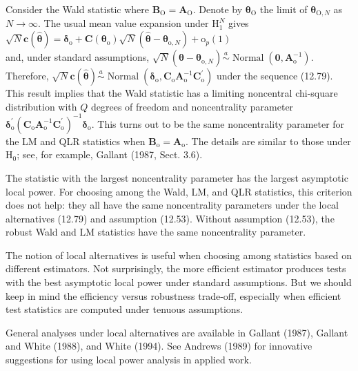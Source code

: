 \documentclass[10pt]{article}
\begin{document}
Consider the Wald statistic where $\mathbf{B}_{\mathrm{O}}=\mathbf{A}_{\mathrm{O}}$. Denote by $\boldsymbol{\theta}_{\mathrm{O}}$ the limit of $\boldsymbol{\theta}_{\mathrm{O}, N}$ as $N \rightarrow \infty$. The usual mean value expansion under $\mathrm{H}_{1}^{N}$ gives\\
$\sqrt{N} \mathbf{c}(\hat{\boldsymbol{\theta}})=\boldsymbol{\delta}_{\mathrm{o}}+\mathbf{C}\left(\boldsymbol{\theta}_{\mathrm{o}}\right) \sqrt{N}\left(\hat{\boldsymbol{\theta}}-\boldsymbol{\theta}_{\mathrm{o}, N}\right)+\mathrm{o}_{p}(1)$\\
and, under standard assumptions, $\sqrt{N}\left(\hat{\boldsymbol{\theta}}-\boldsymbol{\theta}_{\mathrm{o}, N}\right) \stackrel{a}{\sim} \operatorname{Normal}\left(\mathbf{0}, \mathbf{A}_{\mathrm{o}}^{-1}\right)$. Therefore, $\sqrt{N} \mathbf{c}(\hat{\boldsymbol{\theta}}) \stackrel{a}{\sim} \operatorname{Normal}\left(\boldsymbol{\delta}_{\mathrm{o}}, \mathbf{C}_{\mathrm{o}} \mathbf{A}_{\mathrm{o}}^{-1} \mathbf{C}_{\mathrm{o}}^{\prime}\right)$ under the sequence (12.79). This result implies that the Wald statistic has a limiting noncentral chi-square distribution with $Q$ degrees of freedom and noncentrality parameter $\boldsymbol{\delta}_{\mathrm{o}}^{\prime}\left(\mathbf{C}_{\mathrm{o}} \mathbf{A}_{\mathrm{o}}^{-1} \mathbf{C}_{\mathrm{o}}^{\prime}\right)^{-1} \boldsymbol{\delta}_{\mathrm{o}}$. This turns out to be the same noncentrality parameter for the LM and QLR statistics when $\mathbf{B}_{\mathrm{o}}=\mathbf{A}_{\mathrm{o}}$. The details are similar to those under $\mathrm{H}_{0}$; see, for example, Gallant (1987, Sect. 3.6).

The statistic with the largest noncentrality parameter has the largest asymptotic local power. For choosing among the Wald, LM, and QLR statistics, this criterion does not help: they all have the same noncentrality parameters under the local alternatives (12.79) and assumption (12.53). Without assumption (12.53), the robust Wald and LM statistics have the same noncentrality parameter.

The notion of local alternatives is useful when choosing among statistics based on different estimators. Not surprisingly, the more efficient estimator produces tests with the best asymptotic local power under standard assumptions. But we should keep in mind the efficiency versus robustness trade-off, especially when efficient test statistics are computed under tenuous assumptions.

General analyses under local alternatives are available in Gallant (1987), Gallant and White (1988), and White (1994). See Andrews (1989) for innovative suggestions for using local power analysis in applied work.
\end{document}
